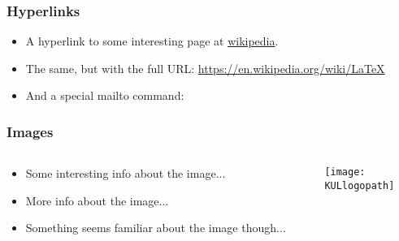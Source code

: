 \documentclass[t, xcolor=table, aspectratio=169]{beamer}
\begin{document}
    \begin{frame}
        \frametitle{Hyperlinks}
        \begin{itemize}
            \item A hyperlink to some interesting page at
                  \href{https://en.wikipedia.org/wiki/LaTeX}{wikipedia}.
            \vspace{2em} %
            \item The same, but with the full URL:
                  \url{https://en.wikipedia.org/wiki/LaTeX}
            \vspace{2em} %
            \item And a special mailto command:
        \end{itemize}
    \end{frame}

    \begin{frame}
        \frametitle{Images}

        \begin{columns}[onlytextwidth,c]
            \begin{column}{0.5\textwidth}
                \begin{itemize}
                    \item Some interesting info about the image...
                    \vspace{2em}
                    \item More info about the image...
                    \vspace{2em}
                    \item Something seems familiar about the image though...
                \end{itemize}
            \end{column}
            \begin{column}{0.5\textwidth}
                \texttt{[image: \\KULlogopath]}
            \end{column}
        \end{columns}
    \end{frame}
\end{document}
